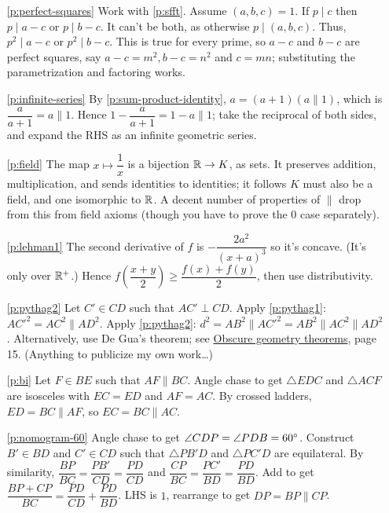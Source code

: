 \documentclass[11pt,paper=letter]{scrartcl}
\newcommand{\pl}{\parallel}
\begin{document}
\begin{enumerate}
\item[\ref{p:perfect-squares}] Work with \ref{p:sfft}. Assume $(a, b, c) = 1$. If $p \mid c$ then $p \mid a - c$ or $p \mid b - c$. It can't be both, as otherwise $p \mid (a, b, c)$. Thus, $p^2 \mid a - c$ or $p^2 \mid b - c$. This is true for every prime, so $a - c$ and $b - c$ are perfect squares, say $a - c = m^2, b - c = n^2$ and $c = mn$; substituting the parametrization and factoring works.

\item[\ref{p:infinite-series}] By \ref{p:sum-product-identity}, $a = (a + 1)(a \pl 1)$, which is $\dfrac{a}{a + 1} = a \pl 1$. Hence $1 - \dfrac{a}{a + 1} = 1 - a \pl 1$; take the reciprocal of both sides, and expand the RHS as an infinite geometric series.

\item[\ref{p:field}] The map $x \mapsto \dfrac{1}{x}$ is a bijection $\mathbb R \to K$, as sets. It preserves addition, multiplication, and sends identities to identities; it follows $K$ must also be a field, and one isomorphic to $\mathbb R$. A decent number of properties of $\pl$ drop from this from field axioms (though you have to prove the $0$ case separately).

\item[\ref{p:lehman1}] The second derivative of $f$ is $-\dfrac{2a^2}{(x + a)^3}$ so it's concave. (It's only over $\mathbb R^+$.) Hence $ f \left( \dfrac{x + y}{2} \right) \ge \dfrac{f(x) + f(y)}{2} $, then use distributivity.

\item[\ref{p:pythag2}] Let $C' \in CD$ such that $AC' \perp CD$. Apply \ref{p:pythag1}: $AC'^2 = AC^2 \pl AD^2$. Apply \ref{p:pythag2}: $d^2 = AB^2 \pl AC'^2 = AB^2 \pl AC^2 \pl AD^2$. Alternatively, use De Gua's theorem; see \href{https://cjquines.com/files/obscuregeothms.pdf}{Obscure geometry theorems}, page 15. (Anything to publicize my own work\dots)

\item[\ref{p:bi}] Let $F \in BE$ such that $AF \pl BC$. Angle chase to get $\triangle EDC$ and $\triangle ACF$ are isosceles with $EC = ED$ and $AF = AC$. By crossed ladders, $ED = BC \pl AF$, so $EC = BC \pl AC$.

\item[\ref{p:nomogram-60}] Angle chase to get $\angle CDP = \angle PDB = 60^\circ$. Construct $B' \in BD$ and $C' \in CD$ such that $\triangle PB'D$ and $\triangle PC'D$ are equilateral. By similarity, $\dfrac{BP}{BC} = \dfrac{PB'}{CD} = \dfrac{PD}{CD}$ and $\dfrac{CP}{BC} = \dfrac{PC'}{BD} = \dfrac{PD}{BD}$. Add to get $\dfrac{BP + CP}{BC} = \dfrac{PD}{CD} + \dfrac{PD}{BD}$. LHS is $1$, rearrange to get $DP = BP \pl CP$.


\end{enumerate}
\end{document}
